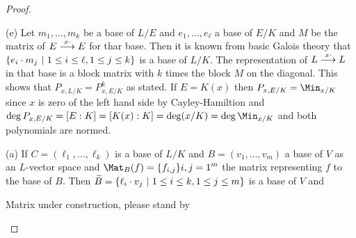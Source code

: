 \documentclass[a4paper,parskip=full,numbers=enddot]{scrreprt}
\begin{document}
    \begin{proof}
        \begin{alphanumerate}
        \item[(e)]
            Let $m_1,\ldots,m_k$ be a base of $L/E$ and $e_1,\ldots,e_\ell$ a base of $E/K$ and $M$ be the matrix of $E\morphism[x\cdot] E$ for thar base. Then it is known from basic Galois theory that $\left\{e_i\cdot m_j\st 1\leq i \leq \ell, 1\leq j \leq k\right\}$ is a base of $L/K$. The representation of $L\morphism[x\cdot] L$ in that base is a block matrix with $k$ times the block $M$ on the diagonal. This shows that $P_{x,L/K} = P_{x,E/K}^k$ as stated. If $E=K(x)$ then $P_{x,E/K} = \Min_{x/K}$ since $x$ is zero of the left hand side by Cayley-Hamiltion and $\deg P_{x,E/K} = [E:K] = [K(x):K] = \deg(x/K) = \deg \Min_{x/K}$ and both polynomials are normed.
        \item[(a)]
            If $C=(\ell_1,\ldots, \ell_k)$ is a base of $L/K$ and $B=(v_1,\ldots,v_m)$ a base of $V$ as an $L$-vector space and $\Mat_B(f) = \{f_{i,j}\}{i,j=1}^m$ the matrix representing $f$ to the base of $B$. Then $\snake B = \left\{\ell_i\cdot v_j\st 1\leq i\leq k, 1\leq j\leq m\right\}$ is a base of $V$ and 
            
            Matrix under construction, please stand by
            

\end{alphanumerate}
\end{proof}
\end{document}
